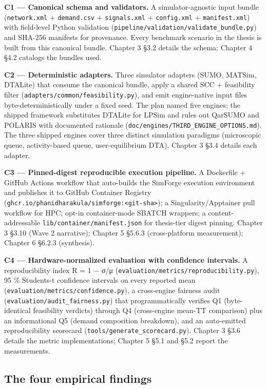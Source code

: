 \textbf{C1 --- Canonical schema and validators.} A simulator-agnostic
input bundle (\texttt{network.xml} + \texttt{demand.csv} +
\texttt{signals.xml} + \texttt{config.xml} + \texttt{manifest.xml}) with
field-level Python validation
(\texttt{pipeline/validation/validate\_bundle.py}) and SHA-256 manifests
for provenance. Every benchmark scenario in the thesis is built from
this canonical bundle. Chapter 3 §3.2 details the schema; Chapter 4 §4.2
catalogs the bundles used.

\textbf{C2 --- Deterministic adapters.} Three simulator adapters (SUMO,
MATSim, DTALite) that consume the canonical bundle, apply a shared SCC +
feasibility filter (\texttt{adapters/common/feasibility.py}), and emit
engine-native input files byte-deterministically under a fixed seed. The
plan named five engines; the shipped framework substitutes DTALite
for LPSim and rules out QarSUMO and POLARIS with documented rationale
(\texttt{doc/engines/THIRD\_ENGINE\_OPTIONS.md}). The three shipped
engines cover three distinct simulation paradigms (microscopic queue,
activity-based queue, user-equilibrium DTA). Chapter 3 §3.4 details each
adapter.

\textbf{C3 --- Pinned-digest reproducible execution pipeline.} A
Dockerfile + GitHub Actions workflow that auto-builds the SimForge
execution environment and publishes it to GitHub Container Registry
(\texttt{ghcr.io/phanidharakula/simforge:\textless{}git-sha\textgreater{}});
a Singularity/Apptainer pull workflow for HPC; opt-in container-mode
SBATCH wrappers; a content-addressable
\texttt{lib/container/manifest.json} for thesis-tier digest pinning.
Chapter 3 §3.10 (Wave 2 narrative); Chapter 5 §5.6.3 (cross-platform
measurement); Chapter 6 §6.2.3 (synthesis).

\textbf{C4 --- Hardware-normalized evaluation with confidence
intervals.} A reproducibility index R = 1 − σ/μ
(\texttt{evaluation/metrics/reproducibility.py}), 95 \%
Student\textquotesingle s-t confidence intervals on every reported mean
(\texttt{evaluation/metrics/confidence.py}), a cross-engine fairness
audit (\texttt{evaluation/audit\_fairness.py}) that programmatically
verifies Q1 (byte-identical feasibility verdicts) through Q4
(cross-engine mean-TT comparison) plus an informational Q5 (demand
composition breakdown), and an auto-emitted reproducibility scorecard
(\texttt{tools/generate\_scorecard.py}). Chapter 3 §3.6 details the
metric implementations; Chapter 5 §5.1 and §5.2 report the measurements.

\subsection{The four empirical
findings}\label{142-the-four-empirical-findings}

